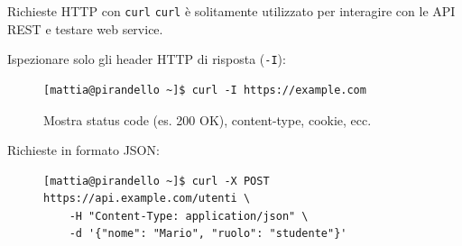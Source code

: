 \begin{frame}[fragile]{Richieste HTTP con \texttt{curl}}
  \texttt{curl} è solitamente utilizzato per interagire con le API REST e testare web service.

  Ispezionare solo gli header HTTP di risposta (\texttt{-I}):
  \begin{figure}
    \begin{lstlisting}[backgroundcolor=\color{expowhite!50!white}]
[mattia@pirandello ~]$ curl -I https://example.com
\end{lstlisting}
    \caption{Mostra status code (es. 200 OK), content-type, cookie, ecc.}
  \end{figure}

  Richieste in formato JSON:
  \begin{figure}
    \begin{lstlisting}[backgroundcolor=\color{expowhite!50!white}]
[mattia@pirandello ~]$ curl -X POST https://api.example.com/utenti \
    -H "Content-Type: application/json" \
    -d '{"nome": "Mario", "ruolo": "studente"}'
\end{lstlisting}
  \end{figure}
\end{frame}